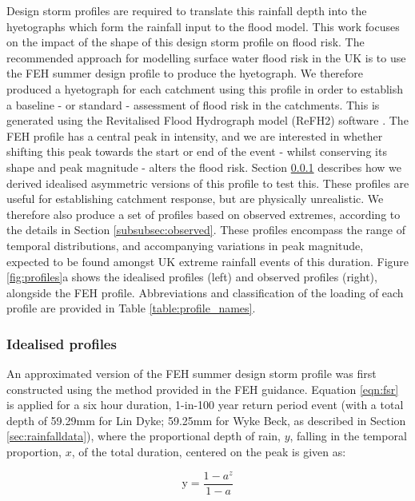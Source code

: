\documentclass[APA,Times2COL]{WileyNJDv5}
\begin{document}
Design storm profiles are required to translate this rainfall depth into the hyetographs which form the rainfall input to the flood model. This work focuses on the impact of the shape of this design storm profile on flood risk. The recommended approach for modelling surface water flood risk in the UK is to use the FEH summer design profile to produce the hyetograph. We therefore produced a hyetograph for each catchment using this profile in order to establish a baseline - or standard - assessment of flood risk in the catchments. This is generated using the Revitalised Flood Hydrograph model (ReFH2) software \citep{kjeldsen2013modelling}. The FEH profile has a central peak in intensity, and we are interested in whether shifting this peak towards the start or end of the event - whilst conserving its shape and peak magnitude -  alters the flood risk. Section \ref{subsubsec:idealised} describes how we derived idealised asymmetric versions of this profile to test this. These profiles are useful for establishing catchment response, but are physically unrealistic. We therefore also produce a set of profiles based on observed extremes, according to the details in Section \ref{subsubsec:observed}. These profiles encompass the range of temporal distributions, and accompanying variations in peak magnitude, expected to be found amongst UK extreme rainfall events of this duration. Figure \ref{fig:profiles}a shows the idealised profiles (left) and observed profiles (right), alongside the FEH profile. Abbreviations and classification of the loading of each profile are provided in Table \ref{table:profile_names}. 

\subsubsection{Idealised profiles}\label{subsubsec:idealised}
An approximated version of the FEH summer design storm profile was first constructed using the method provided in the FEH guidance. Equation \ref{eqn:fsr} is applied for a six hour duration, 1-in-100 year return period event  (with a total depth of 59.29mm for Lin Dyke; 59.25mm for Wyke Beck, as described in Section \ref{sec:rainfalldata}), where the proportional depth of rain, $y$, falling in the temporal proportion, $x$, of the total duration, centered on the peak is given as:

\begin{equation}
\text{y} = \frac{1-a^{z}}{1-a}
  \label{eqn:fsr}
\end{equation}
\end{document}
